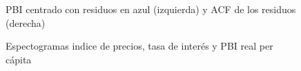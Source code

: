 \documentclass[a4paper]{article}
\begin{document}
\begin{figure}[H]
	\centering
	\caption{PBI centrado con residuos en azul (izquierda) y ACF de los residuos (derecha)}
	\label{fig:PBI_fft_resid}
\end{figure}



\begin{figure}[H]
	\centering
	\caption{Espectogramas indice de precios, tasa de interés y PBI real per cápita}
	\label{fig:spectogram_IPC_IR_real_GDP}
\end{figure}
\end{document}
